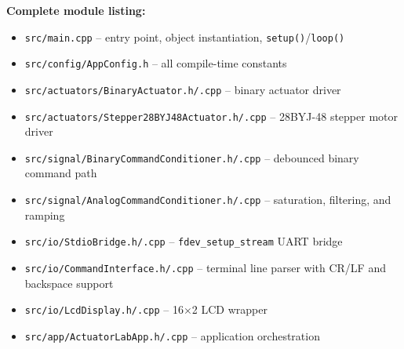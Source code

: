 \documentclass[12pt]{article}
\begin{document}
\bigskip
\noindent\textbf{Complete module listing:}
\begin{itemize}
    \item \texttt{src/main.cpp} -- entry point, object instantiation, \texttt{setup()}/\texttt{loop()}
    \item \texttt{src/config/AppConfig.h} -- all compile-time constants
    \item \texttt{src/actuators/BinaryActuator.h/.cpp} -- binary actuator driver
    \item \texttt{src/actuators/Stepper28BYJ48Actuator.h/.cpp} -- 28BYJ-48 stepper motor driver
    \item \texttt{src/signal/BinaryCommandConditioner.h/.cpp} -- debounced binary command path
    \item \texttt{src/signal/AnalogCommandConditioner.h/.cpp} -- saturation, filtering, and ramping
    \item \texttt{src/io/StdioBridge.h/.cpp} -- \texttt{fdev\_setup\_stream} UART bridge
    \item \texttt{src/io/CommandInterface.h/.cpp} -- terminal line parser with CR/LF and backspace support
    \item \texttt{src/io/LcdDisplay.h/.cpp} -- 16$\times$2 LCD wrapper
    \item \texttt{src/app/ActuatorLabApp.h/.cpp} -- application orchestration
\end{itemize}
\end{document}
